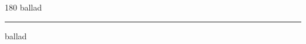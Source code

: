 
\begin{frame}
\begin{center}
\begin{turn}{180}
{\fontsize{2.5cm}{1em}\selectfont ballad}
\end{turn}
\vspace{1em}\par  
\hrule
\vspace{1em}\par  
{\fontsize{2.5cm}{1em}\selectfont ballad}
\end{center}
\end{frame}
